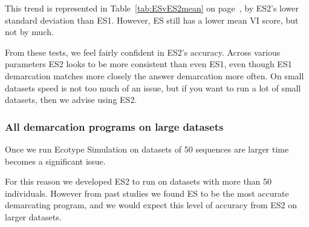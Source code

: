 This trend is represented in Table~\ref{tab:ESvES2mean} on page~\pageref{tab:ESvES2mean}, by ES2's lower standard deviation than ES1.
However, ES still has a lower mean VI score, but not by much.

From these tests, we feel fairly confident in ES2's accuracy.
Across various parameters ES2 looks to be more consistent than even ES1, even though ES1 demarcation matches more closely the answer demarcation more often.
On small datasets speed is not too much of an issue, but if you want to run a lot of small datasets, then we advise using ES2.

\subsubsection*{All demarcation programs on large datasets}
Once we run Ecotype Simulation on datasets of 50 sequences are larger time becomes a significant issue.

For this reason we developed ES2 to run on datasets with more than 50 individuals.
However from past studies we found ES to be the most accurate demarcating program, and we would expect this level of accuracy from ES2 on larger datasets.

%

